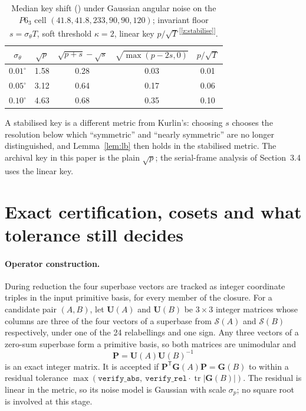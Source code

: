 \documentclass[11pt]{article}
\newcommand{\Ang}{\text{\AA}}
\newcommand{\Gmet}{\mathbf{G}}
\newcommand{\Pop}{\mathbf{P}}
\newcommand{\Uop}{\mathbf{U}}
\newcommand{\Sclosure}{\mathcal{S}}
\newcommand{\chk}[1]{\textsuperscript{[\ref{#1}]}}
\begin{document}
\begin{table}[h]
\centering
\caption{Median key shift (\Ang) under Gaussian angular noise on the $P6_3$ cell $(41.8,41.8,233,90,90,120)$; invariant floor $s=\sigma_\theta T$, soft threshold $\kappa=2$, linear key $p/\sqrt T$\chk{z:stabilise}.}
\label{tab:noise}
\begin{tabular}{ccccc}
\toprule
$\sigma_\theta$ & $\sqrt p$ & $\sqrt{p+s}-\sqrt s$ & $\sqrt{\max(p-2s,0)}$ & $p/\sqrt T$ \\
\midrule
$0.01^\circ$ & 1.58 & 0.28 & 0.03 & 0.01 \\
$0.05^\circ$ & 3.12 & 0.64 & 0.17 & 0.06 \\
$0.10^\circ$ & 4.63 & 0.68 & 0.35 & 0.10 \\
\bottomrule
\end{tabular}
\end{table}

A stabilised key is a different metric from Kurlin's: choosing $s$ chooses the resolution below which ``symmetric'' and ``nearly symmetric'' are no longer distinguished, and Lemma~\ref{lem:lb} then holds in the stabilised metric. The archival key in this paper is the plain $\sqrt p$; the serial-frame analysis of Section~3.4 uses the linear key.

\section{Exact certification, cosets and what tolerance still decides}
\label{app:exact}

\paragraph{Operator construction.}
During reduction the four superbase vectors are tracked as integer coordinate triples in the input primitive basis, for every member of the closure. For a candidate pair $(A,B)$, let $\Uop(A)$ and $\Uop(B)$ be $3\times3$ integer matrices whose columns are three of the four vectors of a superbase from $\Sclosure(A)$ and $\Sclosure(B)$ respectively, under one of the 24 relabellings and one sign. Any three vectors of a zero-sum superbase form a primitive basis, so both matrices are unimodular and
\[
\Pop=\Uop(A)\Uop(B)^{-1}
\]
is an exact integer matrix. It is accepted if $\Pop^{\mathsf T}\Gmet(A)\Pop=\Gmet(B)$ to within a residual tolerance $\max(\texttt{verify\_abs},\ \texttt{verify\_rel}\cdot\operatorname{tr}|\Gmet(B)|)$. The residual is linear in the metric, so its noise model is Gaussian with scale $\sigma_p$; no square root is involved at this stage.
\end{document}
